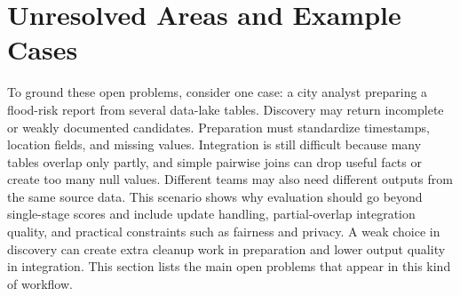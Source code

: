 \documentclass[sigconf]{acmart}
\begin{document}
\section{Unresolved Areas and Example Cases}
To ground these open problems, consider one case: a city analyst preparing a flood-risk report from several data-lake tables. Discovery may return incomplete or weakly documented candidates. Preparation must standardize timestamps, location fields, and missing values. Integration is still difficult because many tables overlap only partly, and simple pairwise joins can drop useful facts or create too many null values. Different teams may also need different outputs from the same source data. This scenario shows why evaluation should go beyond single-stage scores and include update handling, partial-overlap integration quality, and practical constraints such as fairness and privacy. A weak choice in discovery can create extra cleanup work in preparation and lower output quality in integration. This section lists the main open problems that appear in this kind of workflow.
\end{document}
